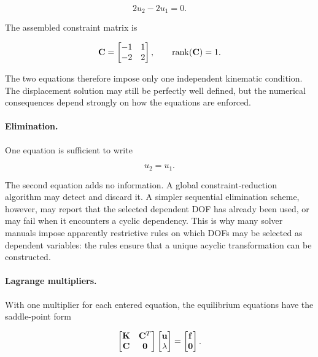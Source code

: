 \begin{equation}
    2u_2-2u_1=0.
\end{equation}

The assembled constraint matrix is

\begin{equation}\label{redundant-c-matrix}
    \mathbf{C}
    =
    \begin{bmatrix}
        -1 & 1\\
        -2 & 2
    \end{bmatrix},
    \qquad
    \operatorname{rank}(\mathbf{C})=1.
\end{equation}

The two equations therefore impose only one independent kinematic condition.
The displacement solution may still be perfectly well defined, but the
numerical consequences depend strongly on how the equations are enforced.

\paragraph{Elimination.}
One equation is sufficient to write

\begin{equation}
    u_2=u_1.
\end{equation}

The second equation adds no information. A global constraint-reduction
algorithm may detect and discard it. A simpler sequential elimination scheme,
however, may report that the selected dependent DOF has already been used, or
may fail when it encounters a cyclic dependency. This is why many solver
manuals impose apparently restrictive rules on which DOFs may be selected as
dependent variables: the rules ensure that a unique acyclic transformation can
be constructed.

\paragraph{Lagrange multipliers.}
With one multiplier for each entered equation, the equilibrium equations have
the saddle-point form

\begin{equation}\label{redundant-lm-system}
    \begin{bmatrix}
        \mathbf{K} & \mathbf{C}^{T}\\
        \mathbf{C} & \mathbf{0}
    \end{bmatrix}
    \begin{bmatrix}
        \mathbf{u}\\
        \mathbf{\lambda}
    \end{bmatrix}
    =
    \begin{bmatrix}
        \mathbf{f}\\
        \mathbf{0}
    \end{bmatrix}.
\end{equation}

